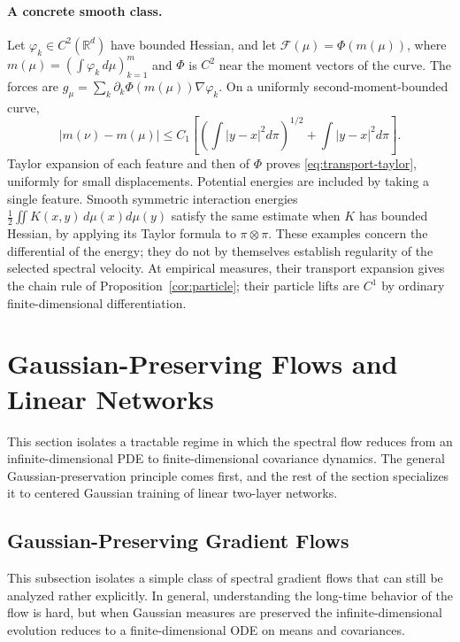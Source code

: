 \documentclass{article}
\newcommand{\R}{\mathbb{R}}
\newcommand{\MF}{\mathcal{F}}
\begin{document}
\paragraph{A concrete smooth class.}
Let $\varphi_k\in C^2(\R^d)$ have bounded Hessian, and let
$\MF(\mu)=\Phi(m(\mu))$, where
$m(\mu)=(\int\varphi_k\,d\mu)_{k=1}^m$ and $\Phi$ is $C^2$ near the
moment vectors of the curve. The forces are
$g_\mu=\sum_k\partial_k\Phi(m(\mu))\nabla\varphi_k$.
On a uniformly second-moment-bounded curve,
\[
 |m(\nu)-m(\mu)|\le C_1
 \left[\left(\int|y-x|^2d\pi\right)^{1/2}
             +\int|y-x|^2d\pi\right].
\]
Taylor expansion of each feature and then of $\Phi$ proves
\eqref{eq:transport-taylor}, uniformly for small displacements.
Potential energies are included by taking a single feature.
Smooth symmetric interaction energies
$\frac12\iint K(x,y)\,d\mu(x)d\mu(y)$ satisfy the same estimate when
$K$ has bounded Hessian, by applying its Taylor formula to $\pi\otimes\pi$.
These examples concern the differential of the energy; they do not by
themselves establish regularity of the selected spectral velocity.
At empirical measures, their transport expansion gives the chain rule
of Proposition~\ref{cor:particle}; their particle lifts are $C^1$ by
ordinary finite-dimensional differentiation.





\section{Gaussian-Preserving Flows and Linear Networks}
\label{app:gaussian-linear}
This section isolates a tractable regime in which the spectral flow reduces from an infinite-dimensional PDE to finite-dimensional covariance dynamics. The general Gaussian-preservation principle comes first, and the rest of the section specializes it to centered Gaussian training of linear two-layer networks.

\subsection{Gaussian-Preserving Gradient Flows}
\label{app-sec:gaussflow}
This subsection isolates a simple class of spectral gradient flows that can still be analyzed rather explicitly. In general, understanding the long-time behavior of the flow is hard, but when Gaussian measures are preserved the infinite-dimensional evolution reduces to a finite-dimensional ODE on means and covariances.
\end{document}
